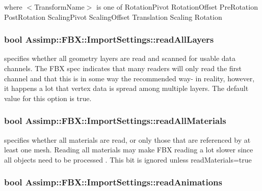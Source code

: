 where $<$\+Transform\+Name$>$ is one of Rotation\+Pivot Rotation\+Offset Pre\+Rotation Post\+Rotation Scaling\+Pivot Scaling\+Offset Translation Scaling Rotation \hypertarget{struct_assimp_1_1_f_b_x_1_1_import_settings_a6f055a1367e73469ee9e67d704d782a9}{
\subsubsection[{read\+All\+Layers}]{\setlength{\rightskip}{0pt plus 5cm}bool Assimp\+::\+F\+B\+X\+::\+Import\+Settings\+::read\+All\+Layers}}\label{struct_assimp_1_1_f_b_x_1_1_import_settings_a6f055a1367e73469ee9e67d704d782a9}
specifies whether all geometry layers are read and scanned for usable data channels. The F\+B\+X spec indicates that many readers will only read the first channel and that this is in some way the recommended way-\/ in reality, however, it happens a lot that vertex data is spread among multiple layers. The default value for this option is true. \hypertarget{struct_assimp_1_1_f_b_x_1_1_import_settings_a5227612d4238915b0a40dc9fa0369023}{
\subsubsection[{read\+All\+Materials}]{\setlength{\rightskip}{0pt plus 5cm}bool Assimp\+::\+F\+B\+X\+::\+Import\+Settings\+::read\+All\+Materials}}\label{struct_assimp_1_1_f_b_x_1_1_import_settings_a5227612d4238915b0a40dc9fa0369023}
specifies whether all materials are read, or only those that are referenced by at least one mesh. Reading all materials may make F\+B\+X reading a lot slower since all objects need to be processed . This bit is ignored unless read\+Materials=true \hypertarget{struct_assimp_1_1_f_b_x_1_1_import_settings_a15c91e04f6849f8305df96bdfd8f2ae8}{
\subsubsection[{read\+Animations}]{\setlength{\rightskip}{0pt plus 5cm}bool Assimp\+::\+F\+B\+X\+::\+Import\+Settings\+::read\+Animations}}\label{struct_assimp_1_1_f_b_x_1_1_import_settings_a15c91e04f6849f8305df96bdfd8f2ae8}
